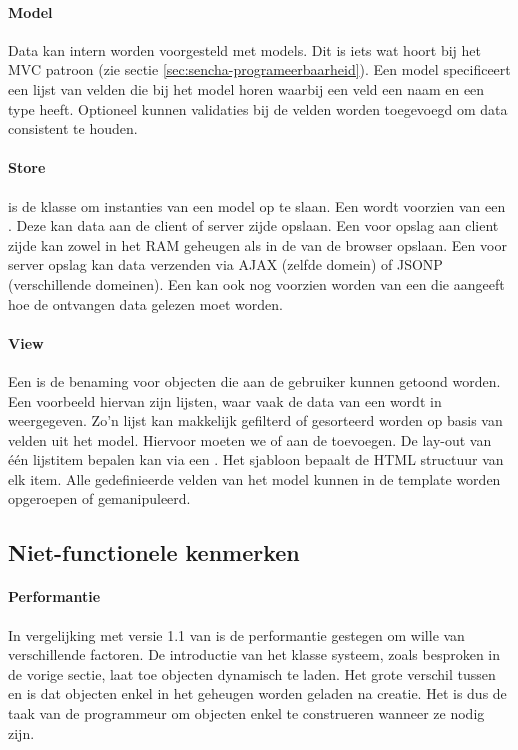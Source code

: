 \paragraph{Model}
Data kan intern worden voorgesteld met models.  
Dit is iets wat hoort bij het MVC patroon (zie sectie \ref{sec:sencha-programeerbaarheid}).  
Een model specificeert een lijst van velden die bij het model horen waarbij een veld een naam en een type heeft.  
Optioneel kunnen validaties bij de velden worden toegevoegd om data consistent te houden.  

\paragraph{Store}
 is de klasse om instanties van een model op te slaan.  
Een  wordt voorzien van een .  
Deze kan data aan de client of server zijde opslaan.  
Een  voor opslag aan client zijde kan zowel in het RAM geheugen als in de  van de browser opslaan.  
Een  voor server opslag kan data verzenden via AJAX (zelfde domein) of JSONP (verschillende domeinen).  
Een  kan ook nog voorzien worden van een  die aangeeft hoe de ontvangen data gelezen moet worden.

\paragraph{View}
Een  is de benaming voor objecten die aan de gebruiker kunnen getoond worden.  
Een voorbeeld hiervan zijn lijsten,  waar vaak de data van een  wordt in weergegeven.  
Zo'n lijst kan makkelijk gefilterd of gesorteerd worden op basis van velden uit het model.  
Hiervoor moeten we  of  aan de  toevoegen. 
De lay-out van één lijstitem bepalen kan via een .  
Het sjabloon bepaalt de HTML structuur van elk item.  
Alle gedefinieerde velden van het model kunnen in de template worden opgeroepen of gemanipuleerd.


\subsection{Niet-functionele kenmerken}
\paragraph{Performantie}
In vergelijking met versie 1.1 van \st{} is de performantie gestegen om wille van verschillende factoren.  
De introductie van het klasse systeem,  zoals besproken in de vorige sectie,  laat toe objecten dynamisch te laden. 
Het grote verschil tussen  en  is dat objecten enkel in het geheugen worden geladen na creatie.  
Het is dus de taak van de programmeur om objecten enkel te construeren wanneer ze nodig zijn.

